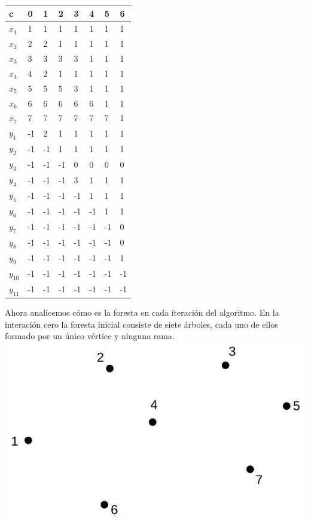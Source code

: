 \documentclass[10pt]{article}
\begin{document}
\begin{center}
\begin{tabular}{|l|l|l|l|l|l|l|l|}
\hline
c & 0 & 1 & 2 & 3 & 4 & 5 & 6 \\
\hline
$x_{1}$ & 1 & 1 & 1 & 1 & 1 & 1 & 1 \\
\hline
$x_{2}$ & 2 & 2 & 1 & 1 & 1 & 1 & 1 \\
\hline
$x_{3}$ & 3 & 3 & 3 & 3 & 1 & 1 & 1 \\
\hline
$x_{4}$ & 4 & 2 & 1 & 1 & 1 & 1 & 1 \\
\hline
$x_{5}$ & 5 & 5 & 5 & 3 & 1 & 1 & 1 \\
\hline
$x_{6}$ & 6 & 6 & 6 & 6 & 6 & 1 & 1 \\
\hline
$x_{7}$ & 7 & 7 & 7 & 7 & 7 & 7 & 1 \\
\hline
$y_{1}$ & -1 & 2 & 1 & 1 & 1 & 1 & 1 \\
\hline
$y_{2}$ & -1 & -1 & 1 & 1 & 1 & 1 & 1 \\
\hline
$y_{3}$ & -1 & -1 & -1 & 0 & 0 & 0 & 0 \\
\hline
$y_{4}$ & -1 & -1 & -1 & 3 & 1 & 1 & 1 \\
\hline
$y_{5}$ & -1 & -1 & -1 & -1 & 1 & 1 & 1 \\
\hline
$y_{6}$ & -1 & -1 & -1 & -1 & -1 & 1 & 1 \\
\hline
$y_{7}$ & -1 & -1 & -1 & -1 & -1 & -1 & 0 \\
\hline
$y_{8}$ & -1 & -1 & -1 & -1 & -1 & -1 & 0 \\
\hline
$y_{9}$ & -1 & -1 & -1 & -1 & -1 & -1 & 1 \\
\hline
$y_{10}$ & -1 & -1 & -1 & -1 & -1 & -1 & -1 \\
\hline
$y_{11}$ & -1 & -1 & -1 & -1 & -1 & -1 & -1 \\
\hline
\end{tabular}
\end{center}

Ahora analicemos cómo es la foresta en cada iteración del algoritmo. En la interación cero la foresta inicial consiste de siete árboles, cada uno de ellos formado por un único vértice y ninguna rama.\\
\includegraphics[max width=\textwidth, center]{2025_09_05_93c7c1835f249f70c0eeg-22}
\end{document}

